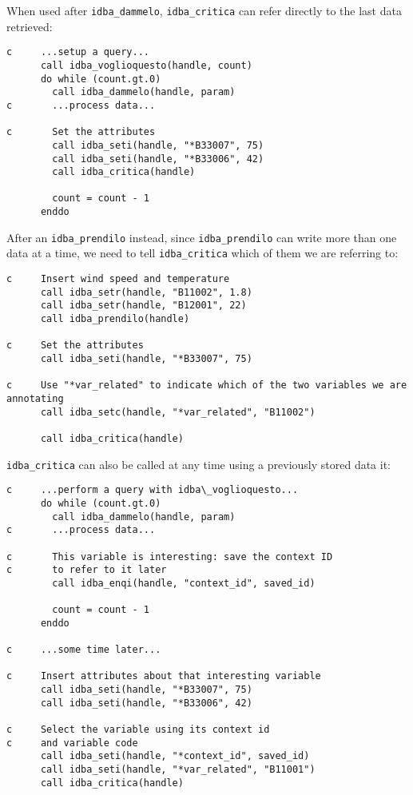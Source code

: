 \documentclass[final,12pt,a4paper,twoside]{book}
\begin{document}
When used after {\tt idba\_dammelo}, {\tt idba\_critica} can refer directly to the
last data retrieved:

\begin{verbatim}
c     ...setup a query...
      call idba_voglioquesto(handle, count)
      do while (count.gt.0)
        call idba_dammelo(handle, param)
c       ...process data...

c       Set the attributes
        call idba_seti(handle, "*B33007", 75)
        call idba_seti(handle, "*B33006", 42)
        call idba_critica(handle)

        count = count - 1
      enddo
\end{verbatim}

After an {\tt idba\_prendilo} instead, since {\tt idba\_prendilo} can write more than
one data at a time, we need to tell {\tt idba\_critica} which of them we are
referring to:

\begin{verbatim}
c     Insert wind speed and temperature
      call idba_setr(handle, "B11002", 1.8)
      call idba_setr(handle, "B12001", 22)
      call idba_prendilo(handle)

c     Set the attributes
      call idba_seti(handle, "*B33007", 75)

c     Use "*var_related" to indicate which of the two variables we are annotating
      call idba_setc(handle, "*var_related", "B11002")

      call idba_critica(handle)
\end{verbatim}


{\tt idba\_critica} can also be called at any time using a previously stored data it:

\begin{verbatim}
c     ...perform a query with idba\_voglioquesto...
      do while (count.gt.0)
        call idba_dammelo(handle, param)
c       ...process data...

c       This variable is interesting: save the context ID
c       to refer to it later
        call idba_enqi(handle, "context_id", saved_id)
        
        count = count - 1
      enddo

c     ...some time later...

c     Insert attributes about that interesting variable
      call idba_seti(handle, "*B33007", 75)
      call idba_seti(handle, "*B33006", 42)
      
c     Select the variable using its context id
c     and variable code
      call idba_seti(handle, "*context_id", saved_id)
      call idba_seti(handle, "*var_related", "B11001")
      call idba_critica(handle)
\end{verbatim}
\end{document}
